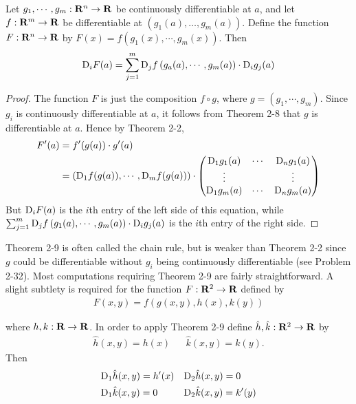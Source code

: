 \begin{theorem}
    Let $g_1, \cdots, g_m:\mathbf{R}^n\to \mathbf{R}$ be continuously differentiable at $a$, and 
    let $f:\mathbf{R}^m\to \mathbf{R}$ be differentiable at $\left(g_1(a), \dots, g_m(a)\right)$. 
    Define the function $F:\mathbf{R}^n\to \mathbf{R}$ by $F(x) = f\left(g_1(x), \cdots, g_m(x)\right)$. Then 
    \begin{align*}
        \mathrm{D}_iF(a) = \sum_{j=1}^{m}{\mathrm{D}_jf\left(g_a(a), \cdots, g_m(a)\right)\cdot \mathrm{D}_ig_j(a)}
    \end{align*}
\end{theorem}

\begin{proof}
    The function $F$ is just the composition $f\circ g$, where $g = (g_1,\cdots,g_m)$.
    Since $g_i$ is continuously differentiable at $a$, it follows from Theorem 2-8 
    that $g$ is differentiable at $a$. Hence by Theorem 2-2,
    \begin{align*}
        F'(a) 
        & = f'(g(a)) \cdot g'(a) \\
        & = \left(\mathrm{D}_1f(g(a)), \cdots, \mathrm{D}_mf(g(a))\right)\cdot 
            \left(\begin{matrix}
                \mathrm{D}_1g_1(a) & \cdots & \mathrm{D}_ng_1(a) \\
                \vdots & & \vdots \\
                \mathrm{D}_1g_m(a) & \cdots & \mathrm{D}_ng_m(a)
            \end{matrix}\right)
    \end{align*}
    But $\mathrm{D}_iF(a)$ is the $i$th entry of the left side of this equation, while 
    $\sum_{j=1}^{m }{\mathrm{D}_jf\left(g_1(a), \cdots, g_m(a)\right)}\cdot \mathrm{D}_ig_j(a)$ is the $i$th 
    entry of the right side.
\end{proof}

Theorem 2-9 is often called the chain rule, but is weaker
than Theorem 2-2 since $g$ could be differentiable without $g_i$
being continuously differentiable (see Problem 2-32).
Most computations requiring Theorem 2-9 are fairly straightforward.
A slight subtlety is required for the function $F:\mathbf{R}^2\to \mathbf{R}$
defined by 
\begin{align*}
    F(x, y) = f\left(g(x, y), h(x), k(y)\right)
\end{align*}

where $h, k:\mathbf{R}\to \mathbf{R}$. In order to apply Theorem 2-9 define $\hat{h}, \hat{k}:\mathbf{R}^2\to \mathbf{R}$ by 
\begin{align*}
    \hat{h}(x, y) = h(x) & & \hat{k}(x, y) = k(y).
\end{align*}
Then 
\begin{align*}
    & \mathrm{D}_1\hat{h}(x, y) = h'(x) && \mathrm{D}_2\hat{h}(x, y) = 0 \\
    & \mathrm{D}_1\hat{k}(x, y) = 0 && \mathrm{D}_2\hat{k}(x, y) = k'(y)
\end{align*}

